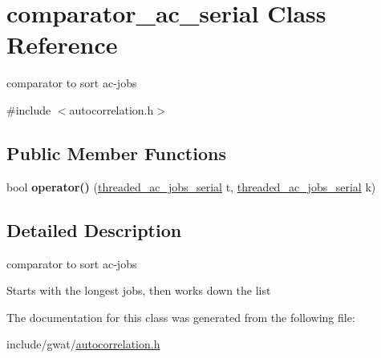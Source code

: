 \hypertarget{classcomparator__ac__serial}{}\section{comparator\+\_\+ac\+\_\+serial Class Reference}
\label{classcomparator__ac__serial}


comparator to sort ac-\/jobs  




{\ttfamily \#include $<$autocorrelation.\+h$>$}

\subsection*{Public Member Functions}
\begin{DoxyCompactItemize}
\item 
\mbox{\label{classcomparator__ac__serial_a327791aa1b3ee7fc9aa47145c6d22557}} 
bool {\bfseries operator()} (\hyperlink{classthreaded__ac__jobs__serial}{threaded\+\_\+ac\+\_\+jobs\+\_\+serial} t, \hyperlink{classthreaded__ac__jobs__serial}{threaded\+\_\+ac\+\_\+jobs\+\_\+serial} k)
\end{DoxyCompactItemize}


\subsection{Detailed Description}
comparator to sort ac-\/jobs 

Starts with the longest jobs, then works down the list 

The documentation for this class was generated from the following file\+:\begin{DoxyCompactItemize}
\item 
include/gwat/\hyperlink{autocorrelation_8h}{autocorrelation.\+h}\end{DoxyCompactItemize}
